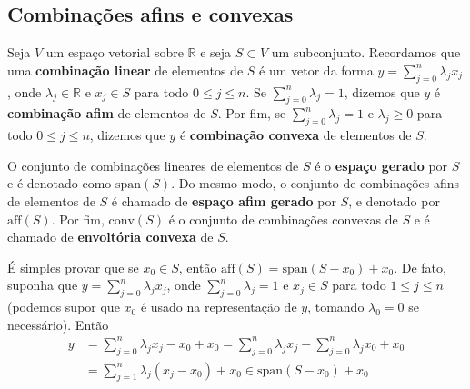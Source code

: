\subsection{Combinações afins e convexas}
\label{comb-afim-convexa-def}
\begin{defi}
	Seja $V$ um espaço vetorial sobre $\mathbb{R}$ e seja $S \subset V$ um subconjunto. Recordamos que uma \textbf{combinação linear} de elementos de $S$ é um vetor da forma $y = \sum_{j=0}^n \lambda_j x_j$, onde $\lambda_j \in \mathbb{R}$ e $x_j \in S$ para todo $0 \leq j \leq n$. Se $\sum_{j=0}^n \lambda_j = 1$, dizemos que $y$ é \textbf{combinação afim} de elementos de $S$. Por fim, se $\sum_{j=0}^n \lambda_j = 1$ e $\lambda_j \geq 0$ para todo $0 \leq j \leq n$, dizemos que $y$ é \textbf{combinação convexa} de elementos de $S$.

    O conjunto de combinações lineares de elementos de $S$ é o \textbf{espaço gerado} por $S$ e é denotado como $\text{span}(S)$. Do mesmo modo, o conjunto de combinações afins de elementos de $S$ é chamado de \textbf{espaço afim gerado} por $S$, e denotado por $\text{aff}(S)$. Por fim, $\text{conv}(S)$ é o conjunto de combinações convexas de $S$ e é chamado de \textbf{envoltória convexa} de $S$.
\end{defi}

É simples provar que se $x_0 \in S$, então $\text{aff}(S) = \text{span}(S-x_0) + x_0$. De fato, suponha que $y = \sum_{j=0}^n \lambda_j x_j$, onde $\sum_{j=0}^n \lambda_j = 1$ e $x_j \in S$ para todo $1 \leq j \leq n$ (podemos supor que $x_0$ é usado na representação de $y$, tomando $\lambda_0 = 0$ se necessário). Então
\begin{align*}
    y &= \sum_{j=0}^n \lambda_j x_j - x_0 + x_0
    = \sum_{j=0}^n \lambda_j x_j - \sum_{j=0}^n \lambda_j x_0 + x_0\\
    &= \sum_{j=1}^n \lambda_j(x_j - x_0) + x_0
    \in \text{span}(S-x_0) + x_0
\end{align*}

